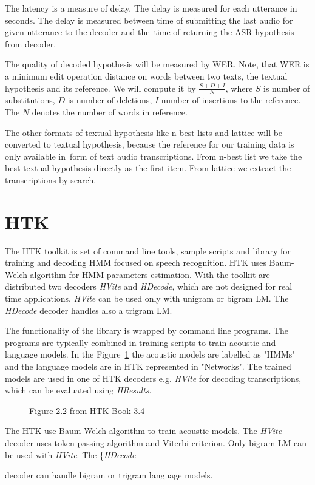 {
The latency is a measure of delay. The delay is measured for each utterance in seconds. 
The delay is measured between time of submitting the last audio for given utterance to the decoder and 
the~time of returning the \ac{ASR} hypothesis from decoder.

The quality of decoded hypothesis will be measured by \ac{WER}.
Note, that \ac{WER} is a minimum edit operation distance on words between two texts, the textual hypothesis
and its reference.
We will compute it by $\frac{S+D+I}{N}$, where $S$ is number of substitutions,
$D$ is number of deletions, $I$ number of insertions to the reference. 
The $N$ denotes the number of words in reference.

The other formats of textual hypothesis like n-best lists and lattice
will be converted to textual hypothesis, because the reference for our training data is only available  
in~form of text audio transcriptions.
From n-best list we take the best textual hypothesis directly as the first item. From lattice
we extract the transcriptions by search.  



\section{\ac{HTK}}
\label{sec:back_htk}
The \ac{HTK} toolkit is set of command line tools, sample scripts and library
for training and decoding \ac{HMM} focused on speech recognition.
\ac{HTK} uses Baum-Welch algorithm for \ac{HMM} parameters estimation.
With the toolkit are distributed two decoders {\it HVite} and {\it HDecode},
which are not designed for real time applications.
{\it HVite} can be used only with unigram or bigram \ac{LM}. 
The {\it HDecode} decoder handles also a trigram \ac{LM}.

The functionality of the library is wrapped by command line programs.
The programs are typically combined in training scripts to train acoustic and language models.
In the Figure~\ref{fig:htk_tools} the acoustic models are labelled as "HMMs" 
and the language models are in \ac{HTK} represented in "Networks".
The trained models are used in one of \ac{HTK} decoders e.g. {\it HVite}\/ for decoding
transcriptions, which can be evaluated using {\it HResults}.

\begin{figure}[!htp]
    \begin{center}
    
    \caption{Figure 2.2 from HTK Book 3.4\cite{young2006htk}}
    \label{fig:htk_tools} 
    \end{center}
\end{figure}

The \ac{HTK} use Baum-Welch algorithm to train acoustic models.
The {\it HVite} decoder uses token passing algorithm and Viterbi criterion.
\cite{HTKBook3.4} %
Only bigram \ac{LM} can be used with {\it HVite}.
The \{\it HDecode} decoder can handle bigram or trigram language models. 


